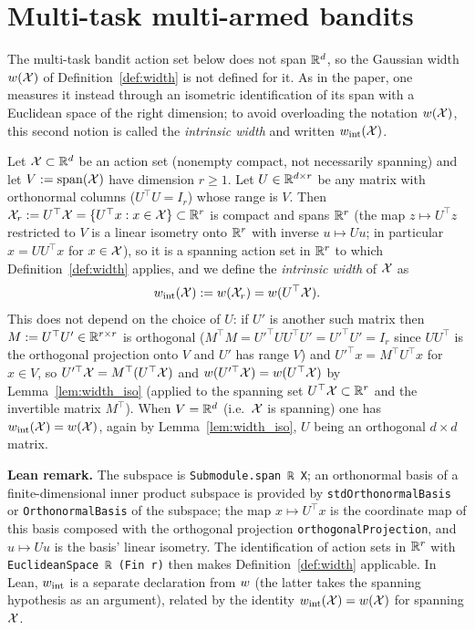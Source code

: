 \section{Multi-task multi-armed bandits}
\label{sec:width_multitask}

The multi-task bandit action set below does not span $\mathbb{R}^d$, so the Gaussian width
$w(\mathcal{X})$ of Definition~\ref{def:width} is not defined for it. As in the paper, one
measures it instead through an isometric identification of its span with a Euclidean space
of the right dimension; to avoid overloading the notation $w(\mathcal{X})$, this second notion is
called the \emph{intrinsic width} and written $w_{\mathrm{int}}(\mathcal{X})$.

\begin{definition}\label{def:width_subspace}
\leanok
{}
Let $\mathcal{X} \subset \mathbb{R}^d$ be an action set (nonempty compact, not necessarily spanning) and let
$V := \operatorname{span}(\mathcal{X})$ have dimension $r \ge 1$. Let
$U \in \mathbb{R}^{d\times r}$ be any matrix with orthonormal columns ($U^\top U = I_r$) whose range
is $V$. Then $\mathcal{X}_r := U^\top\mathcal{X} = \{U^\top x : x\in\mathcal{X}\} \subset \mathbb{R}^r$ is compact and spans
$\mathbb{R}^r$ (the map $z \mapsto U^\top z$ restricted to $V$ is a linear isometry onto $\mathbb{R}^r$ with
inverse $u \mapsto Uu$; in particular $x = UU^\top x$ for $x \in \mathcal{X}$), so it is a spanning
action set in $\mathbb{R}^r$ to which Definition~\ref{def:width} applies, and we define the
\emph{intrinsic width} of $\mathcal{X}$ as
\[
  w_{\mathrm{int}}(\mathcal{X}) := w(\mathcal{X}_r) = w(U^\top \mathcal{X}).
\]
This does not depend on the choice of $U$: if $U'$ is another such matrix then
$M := U^\top U' \in \mathbb{R}^{r\times r}$ is orthogonal ($M^\top M = U'^\top UU^\top U' = U'^\top U' = I_r$
since $UU^\top$ is the orthogonal projection onto $V$ and $U'$ has range $V$) and
$U'^\top x = M^\top U^\top x$ for $x \in V$, so $U'^\top\mathcal{X} = M^\top(U^\top\mathcal{X})$ and
$w(U'^\top\mathcal{X}) = w(U^\top\mathcal{X})$ by Lemma~\ref{lem:width_iso} (applied to the spanning set
$U^\top\mathcal{X} \subset \mathbb{R}^r$ and the invertible matrix $M^\top$). When $V = \mathbb{R}^d$ (i.e.\ $\mathcal{X}$ is
spanning) one has $w_{\mathrm{int}}(\mathcal{X}) = w(\mathcal{X})$, again by Lemma~\ref{lem:width_iso},
$U$ being an orthogonal $d\times d$ matrix.
\end{definition}

\textbf{Lean remark.} The subspace is \texttt{Submodule.span ℝ X}; an orthonormal basis of a
finite-dimensional inner product subspace is provided by \texttt{stdOrthonormalBasis} or
\texttt{OrthonormalBasis} of the subspace; the map $x \mapsto U^\top x$ is the coordinate map
of this basis composed with the orthogonal projection \texttt{orthogonalProjection}, and
$u \mapsto Uu$ is the basis' linear isometry. The identification of action sets in $\mathbb{R}^r$
with \texttt{EuclideanSpace ℝ (Fin r)} then makes Definition~\ref{def:width} applicable.
In Lean, $w_{\mathrm{int}}$ is a separate declaration from $w$ (the latter takes the
spanning hypothesis as an argument), related by the identity
$w_{\mathrm{int}}(\mathcal{X}) = w(\mathcal{X})$ for spanning $\mathcal{X}$.

